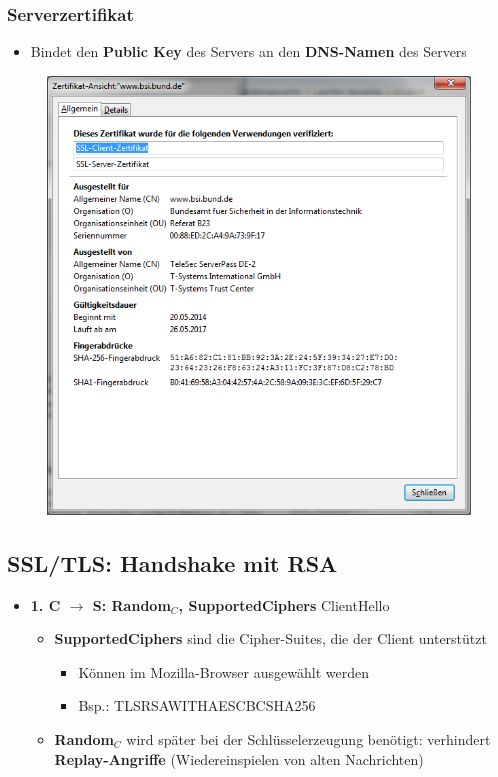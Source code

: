 \documentclass[openany]{book}
\begin{document}
\subsubsection{Serverzertifikat}

\begin{itemize}
    \item Bindet den \textbf{Public Key} des Servers an den \textbf{DNS-Namen} des Servers
\end{itemize}

\begin{figure}[h!]
    \centering
    \includegraphics[width=0.85\linewidth]{Pics/ServerCertificate.PNG}
\end{figure}

\subsection{SSL/TLS: Handshake mit RSA}

\begin{itemize}
    \item \textbf{1. C $\rightarrow$ S: Random$_C$, Supported\textunderscore Ciphers} ClientHello
    \begin{itemize}
        \item \textbf{Supported\textunderscore Ciphers} sind die Cipher-Suites, die der Client unterstützt
        \begin{itemize}
            \item Können im Mozilla-Browser ausgewählt werden
            \item Bsp.: TLS\textunderscore RSA\textunderscore WITH\textunderscore AES\textunderscore CBC\textunderscore SHA256
        \end{itemize}
        \item \textbf{Random$_C$} wird später bei der Schlüsselerzeugung benötigt: verhindert \textbf{Replay-Angriffe} (Wiedereinspielen von alten Nachrichten)
    \end{itemize}
\end{itemize}
\end{document}
